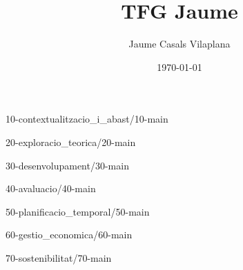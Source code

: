 \documentclass[a4paper, 12pt]{report}
\title{TFG Jaume}
\author{Jaume Casals Vilaplana}
\date{\today}
\begin{document}

\clearpage


\clearpage


\clearpage

{10-contextualitzacio_i_abast/10-main}
\clearpage

{20-exploracio_teorica/20-main}
\clearpage

{30-desenvolupament/30-main}
\clearpage

{40-avaluacio/40-main}
\clearpage

{50-planificacio_temporal/50-main}
\clearpage

{60-gestio_economica/60-main}
\clearpage

{70-sostenibilitat/70-main}
\clearpage




\printbibliography[title={Referències}]

\appendix

\afterpage{\null\newpage}
\end{document}
